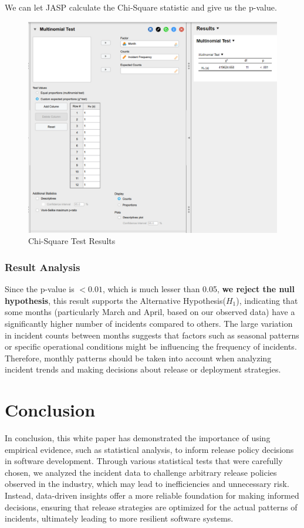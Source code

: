 \documentclass{article}
\begin{document}
We can let JASP calculate the Chi-Square statistic and give us the p-value.

\begin{figure} [H]
    \centering
    \includegraphics[width=0.5\linewidth]{Screenshot 2024-10-20 170522.png}
    \caption{Chi-Square Test Results}
    \label{fig:enter-label}
\end{figure}

\subsubsection{Result Analysis}

Since the p-value is $< 0.01$, which is much lesser than 0.05, \textbf{we reject the null hypothesis}, this result supports the Alternative Hypothesis($H_1$), indicating that some months (particularly March and April, based on our observed data) have a significantly higher number of incidents compared to others. The large variation in incident counts between months suggests that factors such as seasonal patterns or specific operational conditions might be influencing the frequency of incidents. Therefore, monthly patterns should be taken into account when analyzing incident trends and making decisions about release or deployment strategies.

\section{Conclusion}

In conclusion, this white paper has demonstrated the importance of using empirical evidence, such as statistical analysis, to inform release policy decisions in software development. Through various statistical tests that were carefully chosen, we analyzed the incident data to challenge arbitrary release policies observed in the industry, which may lead to inefficiencies and unnecessary risk. Instead, data-driven insights offer a more reliable foundation for making informed decisions, ensuring that release strategies are optimized for the actual patterns of incidents, ultimately leading to more resilient software systems.
\end{document}

